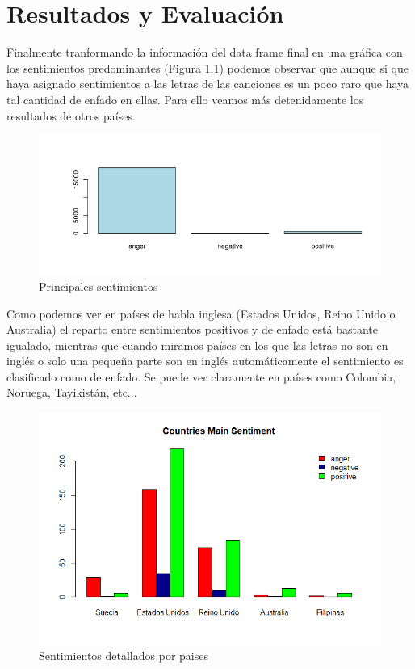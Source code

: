 \chapter{Resultados y Evaluación}
\label{cap:resultadosyevaluacion}

Finalmente tranformando la información del data frame final en una gráfica con los sentimientos predominantes (Figura \ref{fig:most_frecuent_sentiments}) podemos observar que aunque si que haya asignado sentimientos a las letras de las canciones es un poco raro que haya tal cantidad de enfado en ellas. Para ello veamos más detenidamente los resultados de otros países.

\begin{figure}[h]
	\centering
	\includegraphics[width=0.7\linewidth]{Imagenes/most_frecuent_sentiments}
	\caption{Principales sentimientos}
	\label{fig:most_frecuent_sentiments}
\end{figure}

Como podemos ver en países de habla inglesa (Estados Unidos, Reino Unido o Australia) el reparto entre sentimientos positivos y de enfado está bastante igualado, mientras que cuando miramos países en los que las letras no son en inglés o solo una pequeña parte son en inglés automáticamente el sentimiento es clasificado como de enfado. Se puede ver claramente en países como Colombia, Noruega, Tayikistán, etc...

\begin{figure}[h]
	\centering
	\includegraphics[width=0.7\linewidth]{Imagenes/country12}
	\caption{Sentimientos detallados por paises}
	\label{fig:country12}
\end{figure}

